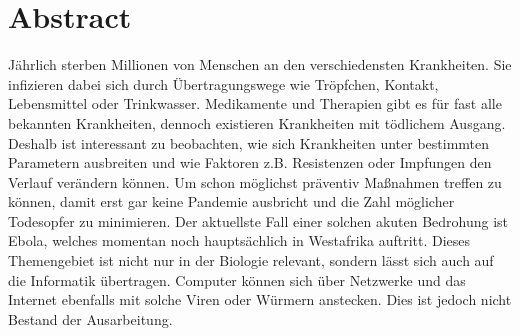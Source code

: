 \section*{Abstract}
Jährlich sterben Millionen von Menschen an den verschiedensten Krankheiten. Sie infizieren dabei sich durch Übertragungswege wie Tröpfchen, Kontakt, Lebensmittel oder Trinkwasser. Medikamente und Therapien gibt es für fast alle bekannten Krankheiten, dennoch existieren Krankheiten mit tödlichem Ausgang. 
Deshalb ist interessant zu beobachten, wie sich Krankheiten unter bestimmten Parametern ausbreiten und wie Faktoren z.B. Resistenzen oder Impfungen den Verlauf verändern können. Um schon möglichst präventiv Maßnahmen treffen zu können, damit erst gar keine Pandemie ausbricht und die Zahl möglicher Todesopfer zu minimieren. Der aktuellste Fall einer solchen akuten Bedrohung ist Ebola, welches momentan noch hauptsächlich in Westafrika auftritt. Dieses Themengebiet ist nicht nur in der Biologie relevant, sondern lässt sich auch auf die Informatik übertragen. Computer können sich über Netzwerke und das Internet ebenfalls mit solche Viren oder Würmern anstecken. Dies ist jedoch nicht Bestand der Ausarbeitung.